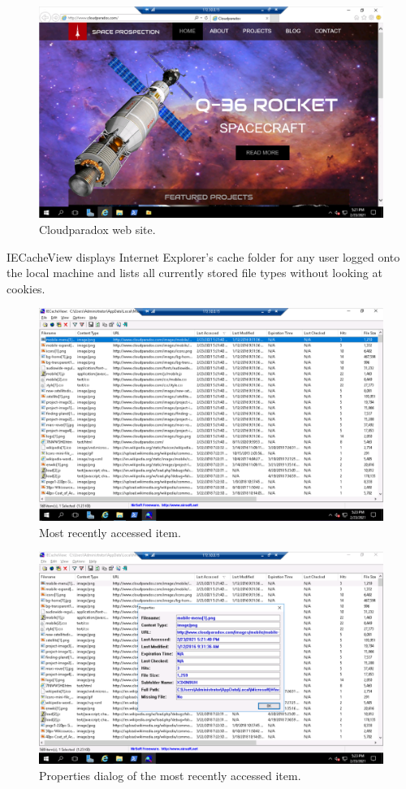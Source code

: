 \begin{figure}[H]
    \centering
    \includegraphics[width=\linewidth]{figures/Part 2 Step 8.png}
    \caption{Cloudparadox web site.}
\end{figure}

IECacheView displays Internet Explorer's cache folder for any user logged onto the local machine and lists all currently stored file types without looking at cookies.
\begin{figure}[H]
    \centering
    \includegraphics[width=\linewidth]{figures/Part 2 Step 11.png}
    \caption{Most recently accessed item.}
\end{figure}

\begin{figure}[H]
    \centering
    \includegraphics[width=\linewidth]{figures/Part 2 Step 12.png}
    \caption{Properties dialog of the most recently accessed item.}
\end{figure}

